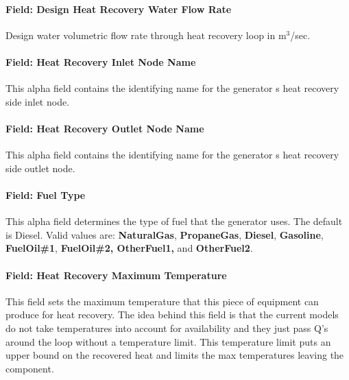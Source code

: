 \paragraph{Field: Design Heat Recovery Water Flow Rate}\label{field-design-heat-recovery-water-flow-rate}

Design water volumetric flow rate through heat recovery loop in m\(^{3}\)/sec.

\paragraph{Field: Heat Recovery Inlet Node Name}\label{field-heat-recovery-inlet-node-name}

This alpha field contains the identifying name for the generator s heat recovery side inlet node.

\paragraph{Field: Heat Recovery Outlet Node Name}\label{field-heat-recovery-outlet-node-name}

This alpha field contains the identifying name for the generator s heat recovery side outlet node.

\paragraph{Field: Fuel Type}\label{field-fuel-type}

This alpha field determines the type of fuel that the generator uses. The default is Diesel. Valid values are: \textbf{NaturalGas}, \textbf{PropaneGas}, \textbf{Diesel}, \textbf{Gasoline}, \textbf{FuelOil\#1}, \textbf{FuelOil\#2, OtherFuel1,} and \textbf{OtherFuel2}.

\paragraph{Field: Heat Recovery Maximum Temperature}\label{field-heat-recovery-maximum-temperature}

This field sets the maximum temperature that this piece of equipment can produce for heat recovery. The idea behind this field is that the current models do not take temperatures into account for availability and they just pass Q's around the loop without a temperature limit. This temperature limit puts an upper bound on the recovered heat and limits the max temperatures leaving the component.

